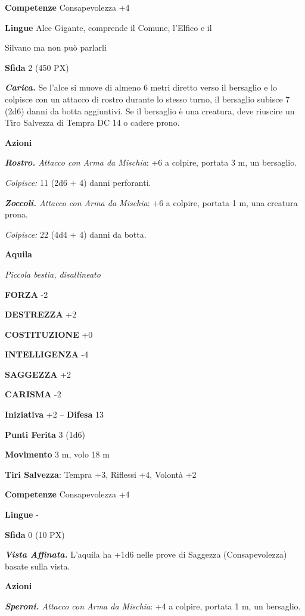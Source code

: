 \begin{multicols}{2}
	\textbf{Competenze} Consapevolezza +4

	\textbf{Lingue} Alce Gigante, comprende il Comune, l'Elfico e il

	Silvano ma non può parlarli

	\textbf{Sfida} 2 (450 PX)

	\textit{\textbf{Carica.}} Se l'alce si muove di almeno 6 metri diretto verso il bersaglio e lo colpisce con un attacco di rostro durante lo stesso turno, il bersaglio subisce 7 (2d6) danni da botta aggiuntivi. Se il bersaglio è una creatura, deve riuscire un Tiro Salvezza di Tempra DC 14 o cadere prono.

	\textbf{Azioni}

	\textit{\textbf{Rostro.} Attacco con Arma da Mischia}: +6 a colpire, portata 3 m, un bersaglio.

	\textit{Colpisce:} 11 (2d6 + 4) danni perforanti.

	\textit{\textbf{Zoccoli.} Attacco con Arma da Mischia}: +6 a colpire, portata 1 m, una creatura prona.

	\textit{Colpisce:} 22 (4d4 + 4) danni da botta.

	\medskip\textbf{Aquila}

	\textit{Piccola bestia, disallineato}

	\textbf{FORZA} -2

	\textbf{DESTREZZA} +2

	\textbf{COSTITUZIONE} +0

	\textbf{INTELLIGENZA} -4

	\textbf{SAGGEZZA} +2

	\textbf{CARISMA} -2

	\textbf{Iniziativa} +2 -- \textbf{Difesa} 13

	\textbf{Punti Ferita} 3 (1d6)

	\textbf{Movimento} 3 m, volo 18 m

	\textbf{Tiri Salvezza}: Tempra +3, Riflessi +4, Volontà +2

	\textbf{Competenze} Consapevolezza +4

	\textbf{Lingue} -

	\textbf{Sfida} 0 (10 PX)

	\textit{\textbf{Vista Affinata.}} L'aquila ha +1d6 nelle prove di Saggezza (Consapevolezza) basate sulla vista.

	\textbf{Azioni}

	\textit{\textbf{Speroni.} Attacco con Arma da Mischia}: +4 a colpire, portata 1 m, un bersaglio.


\end{multicols}
